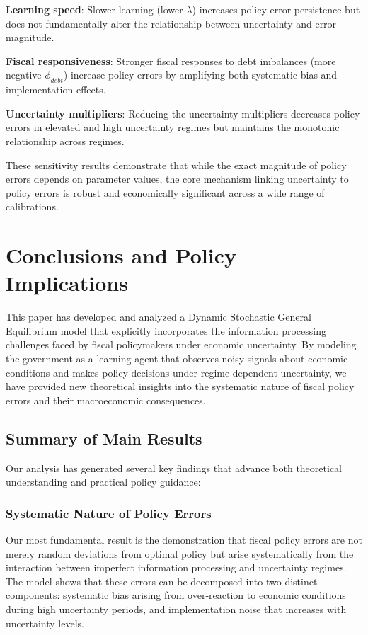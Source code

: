 \documentclass[5p,authoryear]{elsarticle}
\begin{document}
\textbf{Learning speed}: Slower learning (lower $\lambda$) increases policy error persistence but does not fundamentally alter the relationship between uncertainty and error magnitude.

\textbf{Fiscal responsiveness}: Stronger fiscal responses to debt imbalances (more negative $\phi_{debt}$) increase policy errors by amplifying both systematic bias and implementation effects.

\textbf{Uncertainty multipliers}: Reducing the uncertainty multipliers decreases policy errors in elevated and high uncertainty regimes but maintains the monotonic relationship across regimes.

These sensitivity results demonstrate that while the exact magnitude of policy errors depends on parameter values, the core mechanism linking uncertainty to policy errors is robust and economically significant across a wide range of calibrations.

\section{Conclusions and Policy Implications}

This paper has developed and analyzed a Dynamic Stochastic General Equilibrium model that explicitly incorporates the information processing challenges faced by fiscal policymakers under economic uncertainty. By modeling the government as a learning agent that observes noisy signals about economic conditions and makes policy decisions under regime-dependent uncertainty, we have provided new theoretical insights into the systematic nature of fiscal policy errors and their macroeconomic consequences.

\subsection{Summary of Main Results}

Our analysis has generated several key findings that advance both theoretical understanding and practical policy guidance:

\subsubsection{Systematic Nature of Policy Errors}

Our most fundamental result is the demonstration that fiscal policy errors are not merely random deviations from optimal policy but arise systematically from the interaction between imperfect information processing and uncertainty regimes. The model shows that these errors can be decomposed into two distinct components: systematic bias arising from over-reaction to economic conditions during high uncertainty periods, and implementation noise that increases with uncertainty levels.
\end{document}
